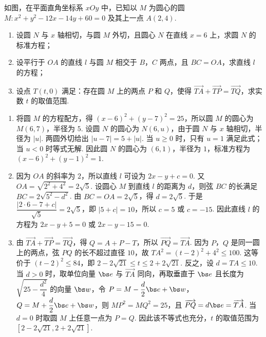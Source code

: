 \begin{problem}
如图，在平面直角坐标系 \(xOy\) 中，已知以 \(M\) 为圆心的圆 \(M:x^2+y^2-12x-14y+60=0\) 及其上一点 \(A(2,4)\).

\begin{enumerate}
\item 设圆 \(N\) 与 \(x\) 轴相切，与圆 \(M\) 外切，且圆心 \(N\) 在直线 \(x=6\) 上，求圆 \(N\) 的标准方程；
\item 设平行于 \(OA\) 的直线 \(l\) 与圆 \(M\) 相交于 \(B\)，\(C\) 两点，且 \(BC=OA\)，求直线 \(l\) 的方程；
\item 设点 \(T(t,0)\) 满足：存在圆 \(M\) 上的两点 \(P\) 和 \(Q\)，使得 \(\overrightarrow{TA}+\overrightarrow{TP}=\overrightarrow{TQ}\)，求实数 \(t\) 的取值范围.
\end{enumerate}

\end{problem}

\begin{solution}
\begin{enumerate}
\item 将圆 \(M\) 的方程配方，得 \((x-6)^2+(y-7)^2=25\)，所以圆 \(M\) 的圆心为 \(M(6,7)\)，半径为 \(5\). 设圆 \(N\) 的圆心为 \(N(6,u)\)，由于圆 \(N\) 与 \(x\) 轴相切，半径为 \(|u|\). 两圆外切给出 \(|u-7|=5+|u|\). 当 \(u\ge0\) 时，只有 \(u=1\) 满足此式；当 \(u<0\) 时等式无解. 因此圆 \(N\) 的圆心为 \((6,1)\)，半径为 \(1\)，标准方程为 \((x-6)^2+(y-1)^2=1\).
\item 因为 \(OA\) 的斜率为 \(2\)，所以直线 \(l\) 可设为 \(2x-y+c=0\). 又 \(OA=\sqrt{2^2+4^2}=2\sqrt5\). 设圆心 \(M\) 到直线 \(l\) 的距离为 \(d\)，则弦 \(BC\) 的长满足 \(BC=2\sqrt{5^2-d^2}\). 由 \(BC=OA=2\sqrt5\)，得 \(d=2\sqrt5\). 于是 \(\dfrac{|2\cdot6-7+c|}{\sqrt5}=2\sqrt5\)，即 \(|5+c|=10\)，所以 \(c=5\) 或 \(c=-15\). 因此直线 \(l\) 的方程为 \(2x-y+5=0\) 或 \(2x-y-15=0\).
\item 由 \(\overrightarrow{TA}+\overrightarrow{TP}=\overrightarrow{TQ}\)，得 \(Q=A+P-T\)，所以 \(\overrightarrow{PQ}=\overrightarrow{TA}\). 因为 \(P\)，\(Q\) 是同一圆上的两点，弦 \(PQ\) 的长不超过直径 \(10\)，故 \(TA^2=(t-2)^2+4^2\le100\). 这等价于 \((t-2)^2\le84\)，即 \(2-2\sqrt{21}\le t\le2+2\sqrt{21}\). 反之，设 \(d=TA\le10\). 当 \(d>0\) 时，取单位向量 \(\bs e\) 与 \(\overrightarrow{TA}\) 同向，再取垂直于 \(\bs e\) 且长度为 \(\sqrt{25-\dfrac{d^2}{4}}\) 的向量 \(\bs w\)，令 \(P=M-\dfrac d2\bs e+\bs w\)，\(Q=M+\dfrac d2\bs e+\bs w\)，则 \(MP^2=MQ^2=25\)，且 \(\overrightarrow{PQ}=d\bs e=\overrightarrow{TA}\). 当 \(d=0\) 时取圆 \(M\) 上任意一点为 \(P=Q\). 因此该不等式也充分，\(t\) 的取值范围为 \(\left[2-2\sqrt{21},2+2\sqrt{21}\right]\).
\end{enumerate}
\end{solution}


